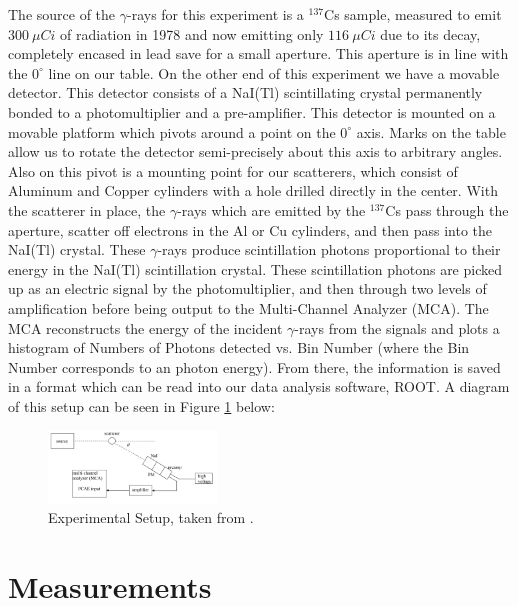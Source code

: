 \documentclass[%
 reprint,
 amsmath,amssymb,
 aps,
 pra,
]{revtex4-1}
\begin{document}
The source of the $\gamma$-rays for this experiment is a $^{137}$Cs sample, measured to emit $300~\mu Ci$ of radiation in 1978 and now emitting only $116~\mu Ci$ due to its decay, completely encased in lead save for a small aperture. This aperture is in line with the $0^\circ$ line on our table. On the other end of this experiment we have a movable detector. This detector consists of a NaI(Tl) scintillating crystal permanently bonded to a photomultiplier and a pre-amplifier. This detector is mounted on a movable platform which pivots around a point on the $0^\circ$ axis. Marks on the table allow us to rotate the detector semi-precisely about this axis to arbitrary angles. Also on this pivot is a mounting point for our scatterers, which consist of Aluminum and Copper cylinders with a hole drilled directly in the center. With the scatterer in place, the $\gamma$-rays which are emitted by the $^{137}$Cs pass through the aperture, scatter off electrons in the Al or Cu cylinders, and then pass into the NaI(Tl) crystal. These $\gamma$-rays produce scintillation photons proportional to their energy in the NaI(Tl) scintillation crystal. These scintillation photons are picked up as an electric signal by the photomultiplier, and then through two levels of amplification before being output to the Multi-Channel Analyzer (MCA). The MCA reconstructs the energy of the incident $\gamma$-rays from the signals and plots a histogram of Numbers of Photons detected vs. Bin Number (where the Bin Number corresponds to an photon energy). From there, the information is saved in a format which can be read into our data analysis software, ROOT. A diagram of this setup can be seen in Figure \ref{Setup} below:
\begin{figure}[H]
	\centering
	\includegraphics[width=0.4\textwidth]{Setup.png}
	\caption{Experimental Setup, taken from \cite{manual}.}
	\label{Setup}
\end{figure}

\section{Measurements}
\end{document}
